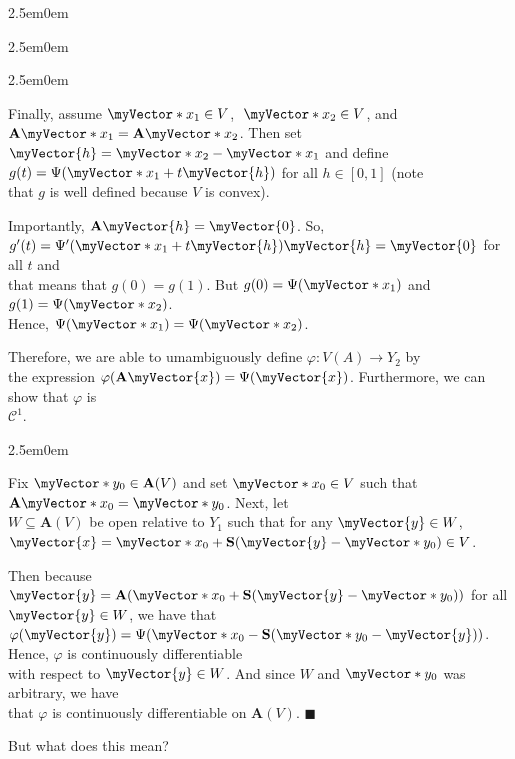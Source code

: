 \documentclass{book}
\newcommand{\hFour}{%
   \color{Cerulean}
   \fontsize{12}{14}\selectfont%
}
\newcommand{\teachComment}{
   \color{Orange}%
   \fontsize{12}{14}\selectfont%
}
\newenvironment{myIndent}{%
   \begin{adjustwidth}{2.5em}{0em}%
}{%
   \end{adjustwidth}%
}
\newcommand{\retTwo}{\hfill\bigbreak}
\newcommand{\mVec}[1]{\myVector{#1}}
\newcommand{\mVecAst}[1]{\myVector*{#1}}
\newcommand{\mMat}[1]{\mathbf{#1}}
\begin{document}
{\begin{myIndent}
{\begin{myIndent}
{\begin{myIndent}
         Finally, assume $\mVecAst{x}_1 \in V$, $\hspace{0.3em}\mVecAst{x}_2 \in V$, and $\mMat{A}\mVecAst{x}_1 = \mMat{A}\mVecAst{x}_2$. Then set\\ $\mVec{h} = \mVecAst{x}_2  - \mVecAst{x}_1$ and define $g(t) = \Psi(\mVecAst{x}_1 + t\mVec{h})$ for all $h \in [0, 1]$ (note\\ that $g$ is well defined because $V$ is convex).\retTwo

         Importantly, $\mMat{A}\mVec{h} = \mVec{0}$. So, $g^\prime(t) = \Psi^\prime(\mVecAst{x}_1 + t\mVec{h})\mVec{h} = \mVec{0}$ for all $t$ and\\ that means that $g(0) = g(1)$. But $g(0)= \Psi(\mVecAst{x}_1)$ and $g(1) = \Psi(\mVecAst{x}_2)$.\\ Hence, $\Psi(\mVecAst{x}_1) = \Psi(\mVecAst{x}_2)$.\retTwo
      \end{myIndent}}

      Therefore, we are able to umambiguously define $\varphi: V(A) \longrightarrow Y_2$ by\\ the expression $\varphi(\mMat{A}\mVec{x}) = \Psi(\mVec{x})$. Furthermore, we can show that $\varphi$ is\\ $\mathscr{C}^1$.

      {\begin{myIndent}\hFour
         Fix $\mVecAst{y}_0 \in \mMat{A}(V)$ and set $\mVecAst{x}_0 \in V$ such that $\mMat{A}\mVecAst{x}_0 = \mVecAst{y}_0$. Next, let\\ $W \subseteq \mMat{A}(V)$ be open relative to $Y_1$ such that for any $\mVec{y} \in W$,\\ $\mVec{x} = \mVecAst{x}_0 + \mMat{S}(\mVec{y} - \mVecAst{y}_0) \in V$.\retTwo

         Then because $\mVec{y} = \mMat{A}(\mVecAst{x}_0 + \mMat{S}(\mVec{y} - \mVecAst{y}_0))$ for all $\mVec{y} \in W$, we have that\\ $\varphi(\mVec{y}) = \Psi(\mVecAst{x}_0 - \mMat{S}(\mVecAst{y}_0 - \mVec{y}))$. Hence, $\varphi$ is continuously differentiable\\ with respect to $\mVec{y} \in W$. And since $W$ and $\mVecAst{y}_0$ was arbitrary, we have\\ that $\varphi$ is continuously differentiable on $\mMat{A}(V)$. $\blacksquare$
         \retTwo\retTwo
      \end{myIndent}}
   \end{myIndent}}

   \teachComment
   But what does this mean?
   

\end{myIndent}}
\end{document}
